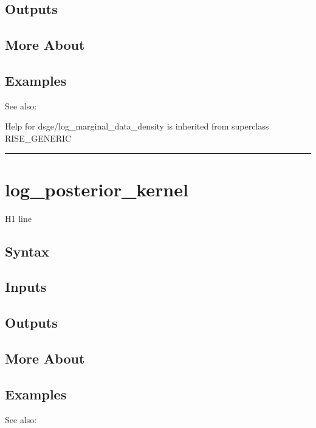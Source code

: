 \documentclass[letterpaper,10pt,english]{sphinxmanual}
\begin{document}
\subsection{Outputs}
\label{classes/models/@dsge/dsge:id105}

\subsection{More About}
\label{classes/models/@dsge/dsge:id106}

\subsection{Examples}
\label{classes/models/@dsge/dsge:id107}
See also:

Help for dsge/log\_marginal\_data\_density is inherited from superclass RISE\_GENERIC


\bigskip\hrule{}\bigskip



\section{log\_posterior\_kernel}
\label{classes/models/@dsge/dsge:log-posterior-kernel}\label{classes/models/@dsge/dsge:id108}
H1 line


\subsection{Syntax}
\label{classes/models/@dsge/dsge:id109}

\subsection{Inputs}
\label{classes/models/@dsge/dsge:id110}

\subsection{Outputs}
\label{classes/models/@dsge/dsge:id111}

\subsection{More About}
\label{classes/models/@dsge/dsge:id112}

\subsection{Examples}
\label{classes/models/@dsge/dsge:id113}
See also:
\end{document}
